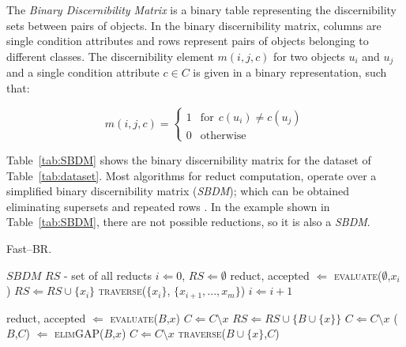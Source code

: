 \documentclass[citenumber]{elsarticle}
\renewcommand{\algorithmicrequire}{\textbf{Input:}}
\renewcommand{\algorithmicensure}{\textbf{Output:}}
\begin{document}
 The \textit{Binary Discernibility Matrix} is a binary table representing the discernibility sets between pairs of objects. In the binary discernibility matrix, columns are single condition attributes and rows represent pairs of objects belonging to different classes. The discernibility element $m(i, j, c)$ for two objects $u_i$ and $u_j$ and a single condition attribute $c \in C$ is given in a binary representation, such that:
 
 \begin{equation}
 m(i, j, c)=\left\lbrace\begin{array}{cl}
 1 & \mathrm{for~~}c(u_i) \neq c(u_j)\\
 0 & \mathrm{otherwise} 
 \end{array}\right.
 \end{equation} 
 
 Table~\ref{tab:SBDM} shows the binary discernibility matrix for the dataset of Table~\ref{tab:dataset}. Most algorithms for reduct computation, operate over a simplified binary discernibility matrix (\textit{SBDM}); which can be obtained eliminating supersets and repeated rows \cite{Yao09}. In the example shown in Table~\ref{tab:SBDM}, there are not possible reductions, so it is also a \textit{SBDM}.
 
 	\renewcommand{\algorithmicrequire}{\textbf{Input:}}
 	\renewcommand{\algorithmicensure}{\textbf{Output:}}
 	\begin{algorithm} \label{alg:fast-BR}
 		\footnotesize
 		\caption{Fast--BR.}
 		\label{alg:RSDM}
 		\begin{multicols}{2}
 			\begin{algorithmic}[1]
 				\Require $SBDM$
 				\Ensure $RS$ - set of all reducts
 				\State $i \Leftarrow 0$, $RS \Leftarrow \emptyset$
 				\State reduct, accepted $\Leftarrow$ \textsc{evaluate}($\emptyset$,$x_i$)
 				\State $RS \Leftarrow RS\cup\lbrace x_i \rbrace$
 				\Else
 				\State \textsc{traverse}($\lbrace x_i \rbrace$, $\lbrace x_{i+1},..., x_m\rbrace$)
 				\EndIf
 				\State $i \Leftarrow i+1$
 				\EndWhile
 				
 				\State reduct, accepted $\Leftarrow$ \textsc{evaluate}($B$,$x$)
 				\State $C \Leftarrow C\setminus x$
 				\State $RS \Leftarrow RS\cup\lbrace B\cup \lbrace x\rbrace \rbrace$
 				\Else
 				\State $C \Leftarrow C\setminus x$
 				\EndIf
 				\EndIf
 				\EndFor
 				\State ($B$,$C$) $\Leftarrow$ \textsc{elimGAP}($B$,$x$)
 				\EndIf
 				\State $C \Leftarrow C\setminus x$
 				\State \textsc{traverse}($B\cup \lbrace x\rbrace$,$C$)
 				\EndFor
 				\EndProcedure
 			\end{algorithmic}
 		\end{multicols}
 	\end{algorithm}    
 
\end{document}
